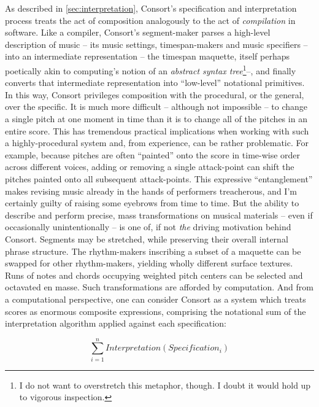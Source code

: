As described in \autoref{sec:interpretation}, Consort's specification and
interpretation process treats the act of composition analogously to the act of
\emph{compilation} in software. Like a compiler, Consort's segment-maker parses
a high-level description of music -- its music settings, timespan-makers and
music specifiers -- into an intermediate representation -- the timespan
maquette, itself perhaps poetically akin to computing's notion of an
\emph{abstract syntax tree}\footnote{I do not want to overstretch this
metaphor, though. I doubt it would hold up to vigorous inspection.}--, and
finally converts that intermediate representation into \enquote{low-level}
notational primitives. In this way, Consort privileges composition with the
procedural, or the general, over the specific. It is much more difficult --
although not impossible -- to change a single pitch at one moment in time than
it is to change all of the pitches in an entire score. This has tremendous
practical implications when working with such a highly-procedural system and,
from experience, can be rather problematic. For example, because pitches are
often \enquote{painted} onto the score in time-wise order across different
voices, adding or removing a single attack-point can shift the pitches painted
onto all subsequent attack-points. This expressive \enquote{entanglement} makes
revising music already in the hands of performers treacherous, and I'm
certainly guilty of raising some eyebrows from time to time. But the ability to
describe and perform precise, mass transformations on musical materials -- even
if occasionally unintentionally -- is one of, if not \emph{the} driving
motivation behind Consort. Segments may be stretched, while preserving their
overall internal phrase structure. The rhythm-makers inscribing a subset of a
maquette can be swapped for other rhythm-makers, yielding wholly different
surface textures. Runs of notes and chords occupying weighted pitch centers can
be selected and octavated en masse. Such transformations are afforded by
computation. And from a computational perspective, one can consider Consort as
a system which treats scores as enormous composite expressions, comprising the
notational sum of the interpretation algorithm applied against each
specification:

\begin{equation}
\displaystyle\sum_{i=1}^{n} Interpretation(Specification_i)
\end{equation}


